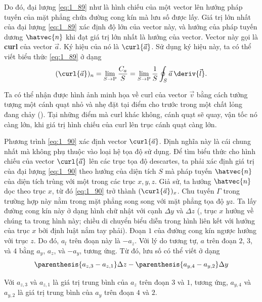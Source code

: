 Do đó, đại lượng \eqref{eq:1_89} như là hình chiếu của một vector lên hướng pháp tuyến của mặt phẳng chứa đường cong kín mà lưu số được lấy. Giá trị lớn nhất của đại lượng \eqref{eq:1_89} xác định độ lớn của vector này, và hướng của pháp tuyến dương $\hatvec{n}$ khi đạt giá trị lớn nhất là hướng của vector. Vector này gọi là \textbf{curl} của vector $\vec{a}$. Ký hiệu của nó là $\curl{\vec{a}}$. Sử dụng ký hiệu này, ta có thể viết biểu thức \eqref{eq:1_89} ở dạng
\begin{equation}\label{eq:1_90}
	(\curl{\vec{a}})_n = \lim_{S\to\text{P}} \frac{C_a}{S} = \lim_{S\to\text{P}} \frac{1}{S} \oint_S \vec{a}\, \deriv{\vec{l}}.
\end{equation}

Ta có thể nhận được hình ảnh minh họa về curl của vector $\vec{v}$ bằng cách tưởng tượng một cánh quạt nhỏ và nhẹ đặt tại điểm cho trước trong một chất lỏng đang chảy (). Tại những điểm mà curl khác không, cánh quạt sẽ quay, vận tốc nó càng lớn, khi giá trị hình chiếu của curl lên trục cánh quạt càng lớn.

Phương trình \eqref{eq:1_90} xác định vector $\curl{\vec{a}}$. Định nghĩa này là cái chung nhất mà không phụ thuộc vào loại hệ tọa độ sử dụng. Để tìm biểu thức cho hình chiếu của vector $\curl{\vec{a}}$ lên các trục tọa độ descartes, ta phải xác định giá trị của đại lượng \eqref{eq:1_90} theo hướng của diện tích $S$ mà pháp tuyến $\hatvec{n}$ của diện tích trùng với một trong các trục $x, y, z$. Giả sử, ta hướng $\hatvec{n}$ dọc theo trục $x$, từ đó \eqref{eq:1_90} trở thành $(\curl{\vec{a}})_x$.
Chu tuyến $\Gamma$ trong trường hợp này nằm trong mặt phẳng song song với mặt phẳng tọa độ $yz$. Ta lấy đường cong kín này ở dạng hình chữ nhật với cạnh $\Delta{y}$ và $\Delta{z}$ (, trục $x$ hướng về chúng ta trong hình này; chiều di chuyển biểu diễn trong hình liên kết với hướng của trục $x$ bởi định luật nắm tay phải). Đoạn $1$ của đường cong kín ngược hướng với trục $z$. Do đó, $a_l$ trên đoạn này là $-a_z$. Với lý do tương tự, $a$ trên đoạn $2$, $3$, và $4$ bằng $a_y$, $a_z$, và $-a_y$, tương ứng. Từ đó, lưu số có thể viết ở dạng
\begin{equation}\label{eq:1_91}
	\parenthesis{a_{z,3} - a_{z,1}} \Delta{z} - \parenthesis{a_{y,4} - a_{y,2}} \Delta{y}
\end{equation}

\noindent
Với $a_{z,3}$ và $a_{z,1}$ là giá trị trung bình của $a_z$ trên đoạn $3$ và $1$, tương ứng, $a_{y,4}$ và $a_{y,2}$ là giá trị trung bình của $a_{y}$ trên đoạn $4$ và $2$.

